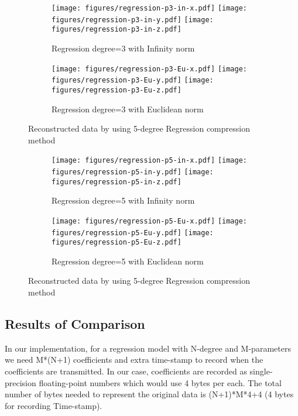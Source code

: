 \begin{figure*}
\centering
\begin{subfigure}{\columnwidth}
\centering
\texttt{[image: figures/regression-p3-in-x.pdf]}
\texttt{[image: figures/regression-p3-in-y.pdf]}
\texttt{[image: figures/regression-p3-in-z.pdf]}
\caption{Regression degree=3 with Infinity norm}
\end{subfigure}

\centering
\begin{subfigure}{\columnwidth}
\centering
\texttt{[image: figures/regression-p3-Eu-x.pdf]}
\texttt{[image: figures/regression-p3-Eu-y.pdf]}
\texttt{[image: figures/regression-p3-Eu-z.pdf]}
\caption{Regression degree=3 with Euclidean norm}
\end{subfigure}

\caption{Reconstructed data by using 5-degree Regression compression method}
\label{fig:poly-regression-3-degree}
\end{figure*}


\begin{figure*}
\centering
\begin{subfigure}{\columnwidth}
\centering
\texttt{[image: figures/regression-p5-in-x.pdf]}
\texttt{[image: figures/regression-p5-in-y.pdf]}
\texttt{[image: figures/regression-p5-in-z.pdf]}
\caption{Regression degree=5 with Infinity norm}
\end{subfigure}

\centering
\begin{subfigure}{\columnwidth}
\centering
\texttt{[image: figures/regression-p5-Eu-x.pdf]}
\texttt{[image: figures/regression-p5-Eu-y.pdf]}
\texttt{[image: figures/regression-p5-Eu-z.pdf]}
\caption{Regression degree=5 with Euclidean norm}
\end{subfigure}

\caption{Reconstructed data by using 5-degree Regression compression method}
\label{fig:poly-regression-5-degree}
\end{figure*}

\subsection{Results of Comparison}
In our implementation, for a regression model with N-degree and M-parameters we
need M*(N+1) coefficients and extra time-stamp to record when the coefficients
are transmitted. In our case, coefficients are recorded as single-precision
floating-point numbers which would use 4 bytes per each. The total number of
bytes needed to represent the original data is (N+1)*M*4+4 (4 bytes for
recording Time-stamp).

